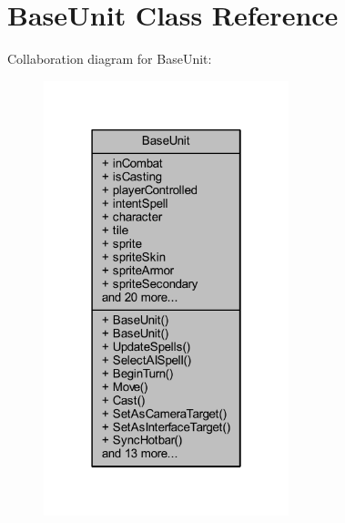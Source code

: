 \hypertarget{class_base_unit}{}\section{Base\+Unit Class Reference}
\label{class_base_unit}


Collaboration diagram for Base\+Unit\+:\nopagebreak
\begin{figure}[H]
\begin{center}
\leavevmode
\includegraphics[width=202pt]{class_base_unit__coll__graph}
\end{center}
\end{figure}
